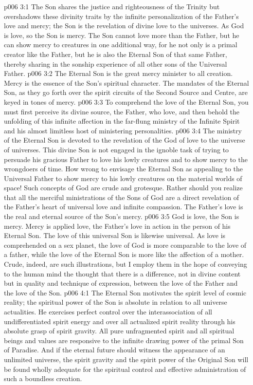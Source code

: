 \vs p006 3:1 The Son shares the justice and righteousness of the Trinity but overshadows these divinity traits by the infinite personalization of the Father’s love and mercy; the Son is the revelation of divine love to the universes. As God is love, so the Son is mercy. The Son cannot love more than the Father, but he can show mercy to creatures in one additional way, for he not only is a primal creator like the Father, but he is also the Eternal Son of that same Father, thereby sharing in the sonship experience of all other sons of the Universal Father.
\vs p006 3:2 The Eternal Son is the great mercy minister to all creation. Mercy is the essence of the Son’s spiritual character. The mandates of the Eternal Son, as they go forth over the spirit circuits of the Second Source and Centre, are keyed in tones of mercy.
\vs p006 3:3 To comprehend the love of the Eternal Son, you must first perceive its divine source, the Father, who  love, and then behold the unfolding of this infinite affection in the far\hyp{}flung ministry of the Infinite Spirit and his almost limitless host of ministering personalities.
\vs p006 3:4 The ministry of the Eternal Son is devoted to the revelation of the God of love to the universe of universes. This divine Son is not engaged in the ignoble task of trying to persuade his gracious Father to love his lowly creatures and to show mercy to the wrongdoers of time. How wrong to envisage the Eternal Son as appealing to the Universal Father to show mercy to his lowly creatures on the material worlds of space! Such concepts of God are crude and grotesque. Rather should you realize that all the merciful ministrations of the Sons of God are a direct revelation of the Father’s heart of universal love and infinite compassion. The Father’s love is the real and eternal source of the Son’s mercy.
\vs p006 3:5 God is love, the Son is mercy. Mercy is applied love, the Father’s love in action in the person of his Eternal Son. The love of this universal Son is likewise universal. As love is comprehended on a sex planet, the love of God is more comparable to the love of a father, while the love of the Eternal Son is more like the affection of a mother. Crude, indeed, are such illustrations, but I employ them in the hope of conveying to the human mind the thought that there is a difference, not in divine content but in quality and technique of expression, between the love of the Father and the love of the Son.
\vs p006 4:1 The Eternal Son motivates the spirit level of cosmic reality; the spiritual power of the Son is absolute in relation to all universe actualities. He exercises perfect control over the interassociation of all undifferentiated spirit energy and over all actualized spirit reality through his absolute grasp of spirit gravity. All pure unfragmented spirit and all spiritual beings and values are responsive to the infinite drawing power of the primal Son of Paradise. And if the eternal future should witness the appearance of an unlimited universe, the spirit gravity and the spirit power of the Original Son will be found wholly adequate for the spiritual control and effective administration of such a boundless creation.
